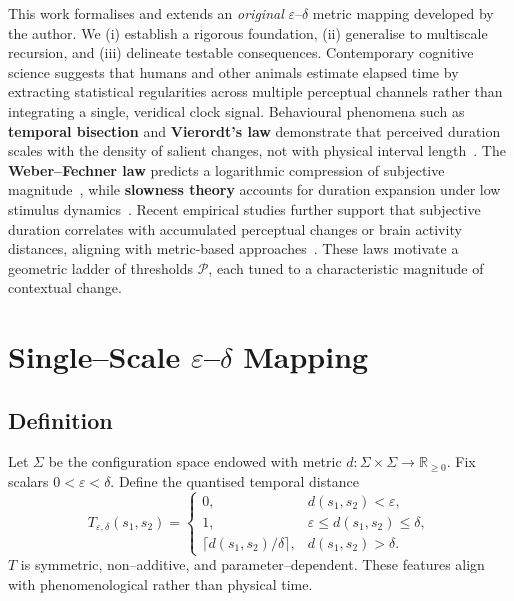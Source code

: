 \documentclass[11pt]{article}
\newcommand{\R}{\mathbb{R}}
\begin{document}
This work formalises and extends an \emph{original}
$\varepsilon$--$\delta$ metric mapping developed by the author.  We
(i) establish a rigorous foundation, (ii) generalise to multiscale
recursion, and (iii) delineate testable consequences.  Contemporary
cognitive science suggests that humans and other animals estimate
elapsed time by extracting statistical regularities across multiple
perceptual channels rather than integrating a single, veridical clock
signal.  Behavioural phenomena such as \textbf{temporal bisection} and
\textbf{Vierordt's law} demonstrate that perceived duration scales
with the density of salient changes, not with physical interval
length~\citep{block1990distinguishing,church1984human}.  The
\textbf{Weber--Fechner law} predicts a logarithmic compression of
subjective magnitude~\citep{fechner1860},
while \textbf{slowness theory} accounts for duration expansion under
low stimulus dynamics~\citep{watanabe85perceptual}. Recent empirical
studies further support that subjective duration correlates with accumulated
perceptual changes or brain activity distances, aligning with metric-based
approaches~\citep{Roseboom2019,Sherman2022}. These laws
motivate a geometric ladder of thresholds $\mathcal P$, each tuned to
a characteristic magnitude of contextual change.

\section{Single--Scale $\varepsilon$--$\delta$ Mapping}
\subsection{Definition}
Let $\Sigma$ be the configuration space endowed with metric
$d:\Sigma\times\Sigma\to\R_{\ge 0}$.  Fix scalars
$0<\varepsilon<\delta$.  Define the quantised temporal distance
\begin{equation}
T_{\varepsilon,\delta}(s_1,s_2)=
\begin{cases}
0, & d(s_1,s_2)<\varepsilon,\\
1, & \varepsilon\le d(s_1,s_2)\le\delta,\\
\bigl\lceil d(s_1,s_2)/\delta \bigr\rceil, & d(s_1,s_2)>\delta.
\end{cases}
\label{eq:single_scale_T}
\end{equation}
$T$ is symmetric, non--additive, and parameter--dependent.  These
features align with phenomenological rather than physical time.
\end{document}

